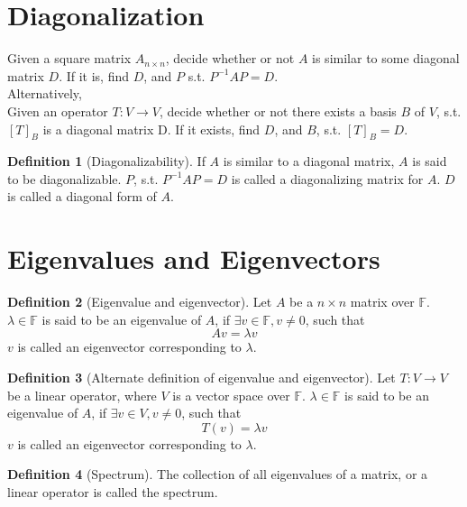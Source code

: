 \documentclass[fleqn, a4paper, 12pt]{article}
\theoremstyle{definition}
\newtheorem{definition}{Definition} %
\theoremstyle{theorem}
\theoremstyle{remark}
\numberwithin{corollary}{theorem}
\numberwithin{equation}{theorem}
\begin{document}
\section{Diagonalization}

Given a square matrix $A_{n \times n}$, decide whether or not $A$ is similar to some diagonal matrix $D$. If it is, find $D$, and $P$ s.t. $P^{-1} A P = D$.\\
Alternatively,\\
Given an operator $T : V \to V$, decide whether or not there exists a basis $B$ of $V$, s.t. $[T]_B$ is a diagonal matrix D. If it exists, find $D$, and $B$, s.t. $[T]_B = D$.

\begin{definition}[Diagonalizability]
	If $A$ is similar to a diagonal matrix, $A$ is said to be diagonalizable. $P$, s.t. $P^{-1} A P = D$ is called a diagonalizing matrix for $A$. $D$ is called a diagonal form of $A$.
\end{definition}

\section{Eigenvalues and Eigenvectors}

\begin{definition}[Eigenvalue and eigenvector]
	Let $A$ be a $n \times n$ matrix over $\mathbb{F}$. $\lambda \in \mathbb{F}$ is said to be an eigenvalue of $A$, if $\exists v \in \mathbb{F}, v\neq 0$, such that
	\begin{equation*}
		A v = \lambda v
	\end{equation*}
	$v$ is called an eigenvector corresponding to $\lambda$.
\end{definition}

\begin{definition}[Alternate definition of eigenvalue and eigenvector]
	Let $T : V \to V$ be a linear operator, where $V$ is a vector space over $\mathbb{F}$. $\lambda \in \mathbb{F}$ is said to be an eigenvalue of $A$, if $\exists v \in V, v\neq 0$, such that
	\begin{equation*}
		T(v) = \lambda v
	\end{equation*}
	$v$ is called an eigenvector corresponding to $\lambda$.
\end{definition}

\begin{definition}[Spectrum]
	The collection of all eigenvalues of a matrix, or a linear operator is called the spectrum.
\end{definition}
\end{document}
